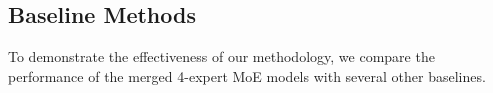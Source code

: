 
\subsection{Baseline Methods}
\label{sec:baseline}
To demonstrate the effectiveness of our methodology, we compare the performance of the merged 4-expert MoE models with several other baselines.

